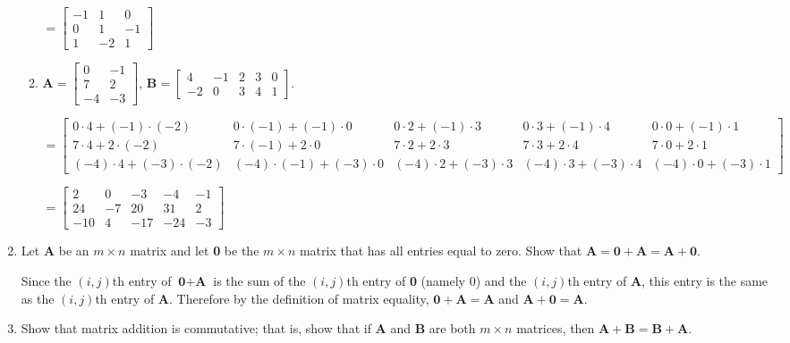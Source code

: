 \documentclass[11pt]{article}
\begin{document}
\begin{enumerate}[label=\textbf{\arabic*.}]
\begin{enumerate}[label=\textbf{\alph*)}]
		$ = 
		\begin{bmatrix}
			-1 & 1 & 0 \\
			0 & 1 & -1 \\
			1 & -2 &1
		\end{bmatrix}$
	
		\item $\textbf{A} =
		\begin{bmatrix}
			0 & -1 \\
			7 & 2 \\
			-4 & -3
		\end{bmatrix}$, $\textbf{B} = 
		\begin{bmatrix}
			4 & -1 & 2 & 3 & 0 \\
			-2 & 0 & 3 & 4 & 1
		\end{bmatrix}$.
	
		$= 
		\begin{bmatrix}
			0 \cdot 4 + (-1) \cdot (-2) & 0 \cdot (-1) + (-1) \cdot 0 & 0 \cdot 2 + (-1) \cdot 3 & 0 \cdot 3 + (-1) \cdot 4 & 0 \cdot 0 + (-1) \cdot 1 \\
			7 \cdot 4 + 2 \cdot (-2) & 7 \cdot (-1) + 2 \cdot 0 & 7 \cdot 2 + 2 \cdot 3 & 7 \cdot 3 + 2 \cdot 4 & 7 \cdot 0 + 2 \cdot 1 \\
			(-4) \cdot 4 + (-3) \cdot (-2) & (-4) \cdot (-1) + (-3) \cdot 0 & (-4) \cdot 2 + (-3) \cdot 3 & (-4) \cdot 3 + (-3) \cdot 4 & (-4) \cdot 0 + (-3) \cdot 1 
		\end{bmatrix}$
	
		$=
		\begin{bmatrix}
			2 & 0 & -3 & -4 & -1 \\
			24 & -7 & 20 & 31 & 2 \\
			-10 & 4 & -17 & -24 & -3
		\end{bmatrix}$
	\end{enumerate}

	\item Let \textbf{A} be an $m \times n$ matrix and let \textbf{0} be the $m \times n$ matrix that has all entries equal to zero. Show that $\textbf{A} = \textbf{0} + \textbf{A} = \textbf{A} + \textbf{0}$.
	
	Since the $(i, j)$th entry of $\textbf{0} + \textbf{A}$ is the sum of the $(i, j)$th entry of \textbf{0} (namely 0) and the $(i, j)$th entry of \textbf{A}, this entry is the same as the $(i, j)$th entry of \textbf{A}. Therefore by the definition of matrix equality, $\textbf{0} + \textbf{A} = \textbf{A}$ and $\textbf{A} + \textbf{0} = \textbf{A}$.
	
	\item Show that matrix addition is commutative; that is, show that if \textbf{A} and \textbf{B} are both $m \times n$ matrices, then $\textbf{A} + \textbf{B} = \textbf{B} + \textbf{A}$.
	

\end{enumerate}
\end{document}

